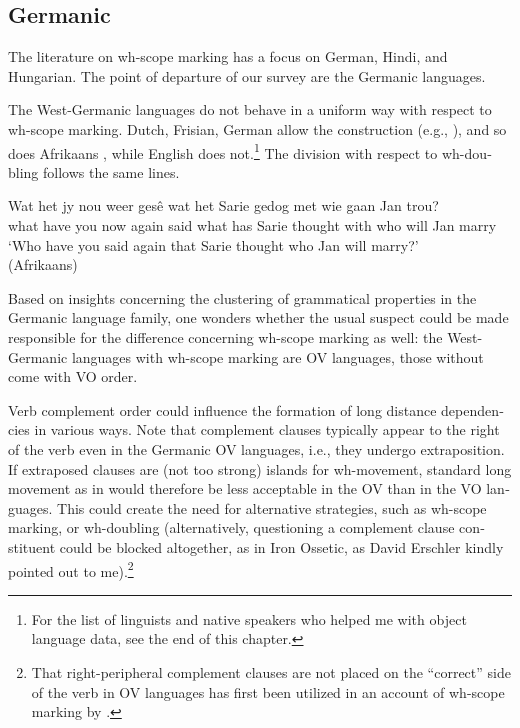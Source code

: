 \documentclass[output=paper,colorlinks,citecolor=brown]{langscibook}
\begin{document}
\begin{otherlanguage}{english}
\section{Germanic} \label{section:germanic}

The literature on wh-scope marking has a focus on German, Hindi, and Hungarian. The point of departure of our survey are the Germanic languages.

The West-Germanic languages do not behave in a uniform way with respect to wh-scope marking. Dutch, Frisian, German allow the construction (e.g., \citealt{Hiemstra1986}), and so does Afrikaans , while English does not.\footnote{For the list of linguists and native speakers who helped me with object language data, see the end of this chapter.
} The division with respect to wh-doubling follows the same lines. 

\ea \label{ex:fanselow:5}
\gll  Wat 	het 	jy 	nou 	weer 	gesê 	wat 	het 	Sarie 	gedog 	met 	wie 	gaan 	Jan 	trou?  \\
    what 	have 	you 	now 	again 	said	what 	has 	Sarie 	thought 	with 	who 	will 	Jan 	marry \\
    \glt    ‘Who have you said again that Sarie thought who Jan will marry?' \\\hfill (Afrikaans)
    \z

\noindent Based on  insights concerning the clustering of grammatical properties in the Germanic language family, one wonders whether the usual suspect could be made responsible for the difference concerning wh-scope marking as well: the West-Germanic languages with wh-scope marking are OV languages, those without come with VO order. 

Verb complement order could influence the formation of long distance dependencies in various ways. Note that complement clauses typically appear to the right of the verb even in the Germanic OV languages, i.e., they undergo extraposition. If extraposed clauses are (not too strong) islands for wh-movement, standard long movement as in  would therefore be less acceptable in the OV  than in the VO languages. This could create the need for alternative strategies, such as wh-scope marking, or wh-doubling (alternatively, questioning a complement clause constituent could be blocked altogether, as in Iron Ossetic, as David Erschler kindly pointed out to me).\footnote{That right-peripheral complement clauses are not placed on the “correct” side of the verb in OV languages has first been utilized in an account of wh-scope marking by \citet{Mahajan1990}.
}


\end{otherlanguage}
\end{document}
